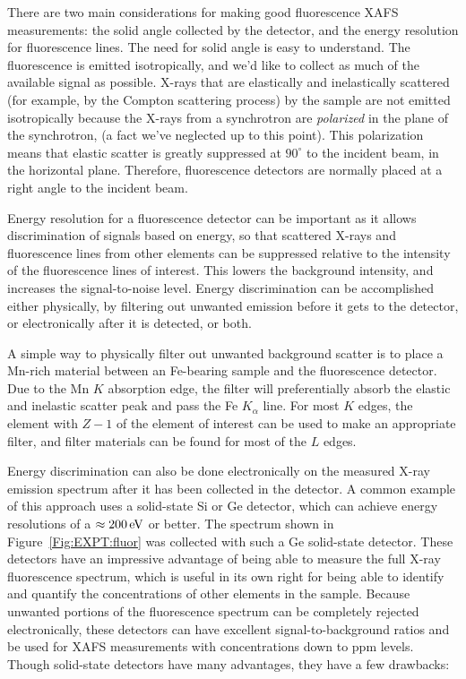 There are two main considerations for making good fluorescence XAFS
measurements: the solid angle collected by the detector, and the energy
resolution for fluorescence lines. The need for solid angle is easy to
understand.  The fluorescence is emitted isotropically, and we'd like to
collect as much of the available signal as possible.  X-rays that are
elastically and inelastically scattered (for example, by the Compton
scattering process) by the sample are not emitted isotropically because the
X-rays from a synchrotron are \emph{polarized} in the plane of the
synchrotron, (a fact we've neglected up to this point).  This polarization
means that elastic scatter is greatly suppressed at $90^{\circ}$ to the
incident beam, in the horizontal plane.  Therefore, fluorescence detectors
are normally placed at a right angle to the incident beam.

Energy resolution for a fluorescence detector can be important as it allows
discrimination of signals based on energy, so that scattered X-rays and
fluorescence lines from other elements can be suppressed relative to the
intensity of the fluorescence lines of interest.  This lowers the
background intensity, and increases the signal-to-noise level.  Energy
discrimination can be accomplished either physically, by filtering out
unwanted emission before it gets to the detector, or electronically after
it is detected, or both.

A simple way to physically filter out unwanted background scatter is to
place a Mn-rich material between an Fe-bearing sample and the fluorescence
detector.  Due to the Mn $K$ absorption edge, the filter will
preferentially absorb the elastic and inelastic scatter peak and pass the
Fe $K_{\alpha }$ line.  For most $K$ edges, the element with $Z-1$ of the
element of interest can be used to make an appropriate filter, and filter
materials can be found for most of the $L$ edges.

Energy discrimination can also be done electronically on the measured X-ray
emission spectrum after it has been collected in the detector.  A common
example of this approach uses a solid-state Si or Ge detector, which can
achieve energy resolutions of a $\approx 200\, \rm{ eV}$ or better.  The
spectrum shown in Figure~\ref{Fig:EXPT:fluor} was collected with such a Ge
solid-state detector.  These detectors have an impressive advantage of
being able to measure the full X-ray fluorescence spectrum, which is useful
in its own right for being able to identify and quantify the concentrations
of other elements in the sample.  Because unwanted portions of the
fluorescence spectrum can be completely rejected electronically, these
detectors can have excellent signal-to-background ratios and be used for
XAFS measurements with concentrations down to ppm levels.  Though
solid-state detectors have many advantages, they have a few drawbacks:

